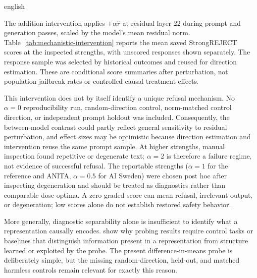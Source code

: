 \begin{otherlanguage*}{english}

\GradedInterventionTable
{}

The addition intervention applies $+\alpha\hat{r}$ at residual layer 22 during prompt and generation passes, scaled by the model's mean residual norm. Table~\ref{tab:mechanistic-intervention} reports the mean saved StrongREJECT scores at the inspected strengths, with unscored responses shown separately. The response sample was selected by historical outcomes and reused for direction estimation. These are conditional score summaries after perturbation, not population jailbreak rates or controlled causal treatment effects.

This intervention does not by itself identify a unique refusal mechanism. No $\alpha=0$ reproducibility run, random-direction control, norm-matched control direction, or independent prompt holdout was included. Consequently, the between-model contrast could partly reflect general sensitivity to residual perturbation, and effect sizes may be optimistic because direction estimation and intervention reuse the same prompt sample. At higher strengths, manual inspection found repetitive or degenerate text; $\alpha=2$ is therefore a failure regime, not evidence of successful refusal. The reportable strengths ($\alpha=1$ for the reference and ANITA, $\alpha=0.5$ for AI Sweden) were chosen post hoc after inspecting degeneration and should be treated as diagnostics rather than comparable dose optima. A zero graded score can mean refusal, irrelevant output, or degeneration; low scores alone do not establish restored safety behavior.

More generally, diagnostic separability alone is insufficient to identify what a representation causally encodes. \textcite{hewittDesigningInterpretingProbes2019} show why probing results require control tasks or baselines that distinguish information present in a representation from structure learned or exploited by the probe. The present difference-in-means probe is deliberately simple, but the missing random-direction, held-out, and matched harmless controls remain relevant for exactly this reason.


\end{otherlanguage*}
